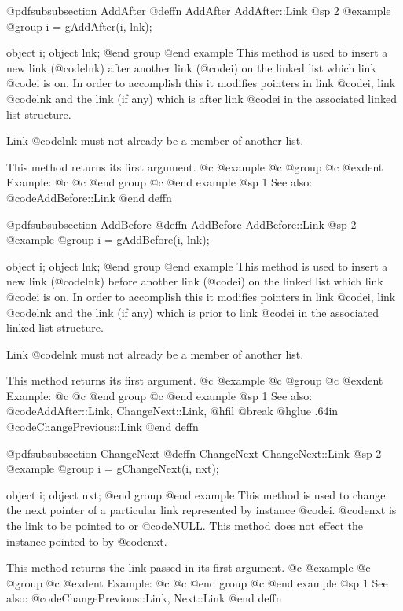 @pdfsubsubsection {AddAfter}
@deffn {AddAfter} AddAfter::Link
@sp 2
@example
@group
i = gAddAfter(i, lnk);

object  i;
object  lnk;
@end group
@end example
This method is used to insert a new link (@code{lnk}) after another
link (@code{i}) on the linked list which link @code{i} is on.  In order
to accomplish this it modifies pointers in link @code{i}, link
@code{lnk} and the link (if any) which is after link @code{i} in
the associated linked list structure.

Link @code{lnk} must not already be a member of another list.

This method returns its first argument.
@c @example
@c @group
@c @exdent Example:
@c 
@c @end group
@c @end example
@sp 1
See also:  @code{AddBefore::Link}
@end deffn







@pdfsubsubsection {AddBefore}
@deffn {AddBefore} AddBefore::Link
@sp 2
@example
@group
i = gAddBefore(i, lnk);

object  i;
object  lnk;
@end group
@end example
This method is used to insert a new link (@code{lnk}) before another
link (@code{i}) on the linked list which link @code{i} is on.  In order
to accomplish this it modifies pointers in link @code{i}, link
@code{lnk} and the link (if any) which is prior to link @code{i} in
the associated linked list structure.

Link @code{lnk} must not already be a member of another list.

This method returns its first argument.
@c @example
@c @group
@c @exdent Example:
@c 
@c @end group
@c @end example
@sp 1
See also:  @code{AddAfter::Link, ChangeNext::Link,}
@hfil @break @hglue .64in      @code{ChangePrevious::Link}
@end deffn








@pdfsubsubsection {ChangeNext}
@deffn {ChangeNext} ChangeNext::Link
@sp 2
@example
@group
i = gChangeNext(i, nxt);

object  i;
object  nxt;
@end group
@end example
This method is used to change the next pointer of a particular link
represented by instance @code{i}.  @code{nxt} is the link to be pointed
to or @code{NULL}.  This method does not effect the instance pointed to
by @code{nxt}.

This method returns the link passed in its first argument.
@c @example
@c @group
@c @exdent Example:
@c 
@c @end group
@c @end example
@sp 1
See also:  @code{ChangePrevious::Link, Next::Link}
@end deffn





